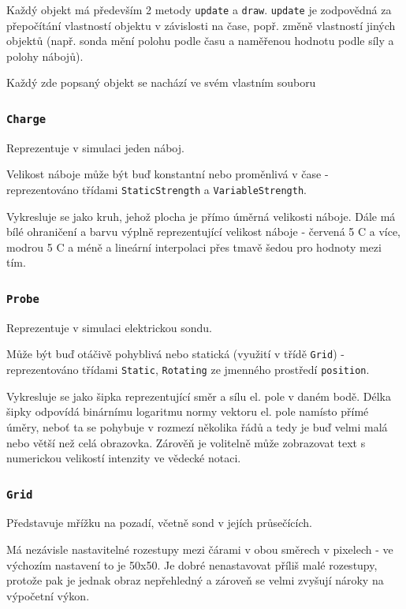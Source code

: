 \documentclass[12pt,a4paper]{paper}
\newcommand{\code}[1]{\texttt{#1}}
\begin{document}
Každý objekt má především 2 metody \code{update} a \code{draw}. \code{update} je
zodpovědná za přepočítání vlastností objektu v závislosti na čase, popř. změně
vlastností jiných objektů (např. sonda mění polohu podle času a naměřenou
hodnotu podle síly a polohy nábojů).

Každý zde popsaný objekt se nachází ve svém vlastním souboru

\subsubsection{\code{Charge}}

Reprezentuje v simulaci jeden náboj. 

Velikost náboje může být buď konstantní nebo proměnlivá v čase - reprezentováno
třídami \code{StaticStrength} a \code{VariableStrength}. 

Vykresluje se jako kruh, jehož plocha je přímo úměrná velikosti náboje. Dále má
bílé ohraničení a barvu výplně reprezentující velikost náboje - červená 5 C a více,
modrou 5 C a méně a lineární interpolaci přes tmavě šedou pro hodnoty mezi tím.

\subsubsection{\code{Probe}}

Reprezentuje v simulaci elektrickou sondu.

Může být buď otáčivě pohyblivá nebo statická (využití v třídě \code{Grid}) -
reprezentováno třídami \code{Static}, \code{Rotating} ze jmenného prostředí
\code{position}.

Vykresluje se jako šipka reprezentující směr a sílu el. pole v daném bodě.
Délka šipky odpovídá binárnímu logaritmu normy vektoru el. pole namísto přímé
úměry, neboť ta se pohybuje v rozmezí několika řádů a tedy je buď velmi malá
nebo větší než celá obrazovka. Zárověň je volitelně může zobrazovat text s
numerickou velikostí intenzity ve vědecké notaci.

\subsubsection{\code{Grid}}

Představuje mřížku na pozadí, včetně sond v jejích průsečících.

Má nezávisle nastavitelné rozestupy mezi čárami v obou směrech v pixelech - ve
výchozím nastavení to je 50x50. Je dobré nenastavovat příliš malé rozestupy,
protože pak je jednak obraz nepřehledný a zároveň se velmi zvyšují nároky na
výpočetní výkon.
\end{document}

